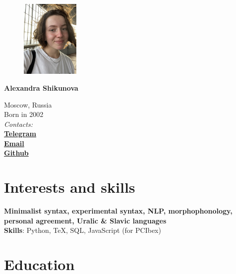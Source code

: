 \documentclass[11pt]{article} %
\begin{document}

\begin{figure} %
    \centering
    \includegraphics[width=0.25\textwidth]{photo}
\end{figure}
{\LARGE\bfseries Alexandra Shikunova} %
\bigskip\bigskip\medskip %

Moscow, Russia\\
Born in 2002\\

\textit{Contacts:}\\
\textbf{\href{https://t.me/thnlgrlivrlvdwsbrnwthrssnhrys}{Telegram}}\\
\textbf{\href{mailto:notalexandrashikunova@gmail.com}{Email}}\\
\textbf{\href{https://github.com/poisongrapevine}{Github}}
\medskip %


\section*{Interests and skills}

\textbf{Minimalist syntax, experimental syntax, NLP, morphophonology, personal agreement, Uralic \& Slavic languages}\\
\textbf{Skills}: Python, TeX, SQL, JavaScript (for PCIbex)


\section*{Education}
\end{document}
